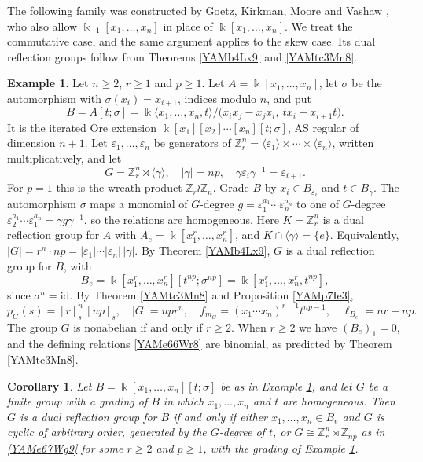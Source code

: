 \documentclass[reqno]{amsart}
\numberwithin{equation}{section}
\newtheorem{corollary}[equation]{Corollary}
\theoremstyle{definition}
\newtheorem{example}[equation]{Example}
\theoremstyle{remark}
\theoremstyle{plain}
\newcommand{\kk}{\Bbbk}
\begin{document}
The following family was constructed by Goetz, Kirkman, Moore and Vashaw \cite[Example 2.1.7]{GKMV}, who also allow $\kk_{-1}[x_1,\dots,x_n]$ in place of $\kk[x_1,\dots,x_n]$. We treat the commutative case, and the same argument applies to the skew case. Its dual reflection groups follow from Theorems \ref{YAMb4Lx9} and \ref{YAMtc3Mn8}.

\begin{example}\label{YAMex7Wr3}
Let $n\ge2$, $r\ge1$ and $p\ge1$. Let $A=\kk[x_1,\dots,x_n]$, let $\sigma$ be the automorphism with $\sigma(x_i)=x_{i+1}$, indices modulo $n$, and put
\begin{equation}\label{YAMe66Wr8}
B=A[t;\sigma]=\kk\langle x_1,\dots,x_n,t\rangle/\big(x_ix_j-x_jx_i,\ tx_i-x_{i+1}t\big).
\end{equation}
It is the iterated Ore extension $\kk[x_1][x_2]\cdots[x_n][t;\sigma]$, AS regular of dimension $n+1$. Let $\varepsilon_1,\dots,\varepsilon_n$ be generators of $\mathbb Z_r^n=\langle\varepsilon_1\rangle\times\cdots\times\langle\varepsilon_n\rangle$, written multiplicatively, and let
\begin{equation}\label{YAMe67Wg9}
G=\mathbb Z_r^n\rtimes\langle\gamma\rangle,\quad|\gamma|=np,\quad\gamma\varepsilon_i\gamma^{-1}=\varepsilon_{i+1}.
\end{equation}
For $p=1$ this is the wreath product $\mathbb Z_r\wr\mathbb Z_n$. Grade $B$ by $x_i\in B_{\varepsilon_i}$ and $t\in B_\gamma$. The automorphism $\sigma$ maps a monomial of $G$-degree $g=\varepsilon_1^{a_1}\cdots\varepsilon_n^{a_n}$ to one of $G$-degree $\varepsilon_2^{a_1}\cdots\varepsilon_1^{a_n}=\gamma g\gamma^{-1}$, so the relations are homogeneous. Here $K=\mathbb Z_r^n$ is a dual reflection group for $A$ with $A_e=\kk[x_1^r,\dots,x_n^r]$, and $K\cap\langle\gamma\rangle=\{e\}$. Equivalently, $|G|=r^n\cdot np=|\varepsilon_1|\cdots|\varepsilon_n|\,|\gamma|$. By Theorem \ref{YAMb4Lx9}, $G$ is a dual reflection group for $B$, with
\[
B_e=\kk[x_1^r,\dots,x_n^r][t^{np};\sigma^{np}]=\kk[x_1^r,\dots,x_n^r,t^{np}],
\]
since $\sigma^n=\mathrm{id}$. By Theorem \ref{YAMtc3Mn8} and Proposition \ref{YAMp7Ie3},
\[
p_G(s)=[r]_s^n\,[np]_s,\quad|G|=npr^n,\quad f_{m_G}=(x_1\cdots x_n)^{r-1}t^{np-1},\quad\ell_{B_e}=nr+np.
\]
The group $G$ is nonabelian if and only if $r\ge2$. When $r\ge2$ we have $(B_e)_1=0$, and the defining relations \eqref{YAMe66Wr8} are binomial, as predicted by Theorem \ref{YAMtc3Mn8}.
\end{example}

\begin{corollary}\label{YAMc7Wr4}
Let $B=\kk[x_1,\dots,x_n][t;\sigma]$ be as in Example \ref{YAMex7Wr3}, and let $G$ be a finite group with a grading of $B$ in which $x_1,\dots,x_n$ and $t$ are homogeneous. Then $G$ is a dual reflection group for $B$ if and only if either $x_1,\dots,x_n\in B_e$ and $G$ is cyclic of arbitrary order, generated by the $G$-degree of $t$, or $G\cong\mathbb Z_r^n\rtimes\mathbb Z_{np}$ as in \eqref{YAMe67Wg9} for some $r\ge2$ and $p\ge1$, with the grading of Example \ref{YAMex7Wr3}.
\end{corollary}
\end{document}

